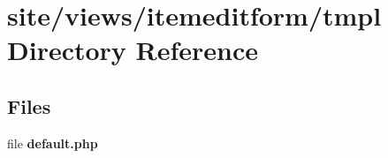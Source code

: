 \section{site/views/itemeditform/tmpl Directory Reference}
\label{dir_0e446593944f59e4b2f221401ff6ff68}
\subsection*{Files}
\begin{DoxyCompactItemize}
\item 
file \textbf{ default.\+php}
\end{DoxyCompactItemize}
